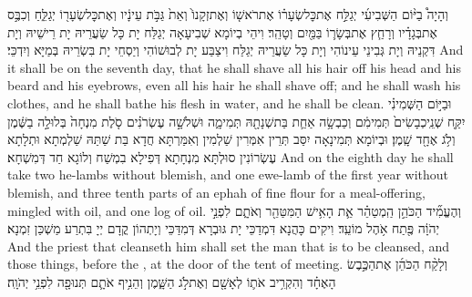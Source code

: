 {וְהָיָה֩ בַיּ֨וֹם הַשְּׁבִיעִ֜י יְגַלַּ֣ח אֶת\maqqaf כׇּל\maqqaf שְׂעָר֗וֹ אֶת\maqqaf רֹאשׁ֤וֹ וְאֶת\maqqaf זְקָנוֹ֙ וְאֵת֙ גַּבֹּ֣ת עֵינָ֔יו וְאֶת\maqqaf כׇּל\maqqaf שְׂעָר֖וֹ יְגַלֵּ֑חַ וְכִבֶּ֣ס אֶת\maqqaf בְּגָדָ֗יו וְרָחַ֧ץ אֶת\maqqaf בְּשָׂר֛וֹ בַּמַּ֖יִם וְטָהֵֽר׃}
{וִיהֵי בְיוֹמָא שְׁבִיעָאָה יְגַלַּח יָת כָּל שַׂעֲרֵיהּ יָת רֵישֵׁיהּ וְיָת דִּקְנֵיהּ וְיָת גְּבִינֵי עֵינוֹהִי וְיָת כָּל שַׂעֲרֵיהּ יְגַלַּח וִיצַבַּע יָת לְבוּשׁוֹהִי וְיַסְחֵי יָת בִּשְׂרֵיהּ בְּמַיָּא וְיִדְכֵּי׃}
{And it shall be on the seventh day, that he shall shave all his hair off his head and his beard and his eyebrows, even all his hair he shall shave off; and he shall wash his clothes, and he shall bathe his flesh in water, and he shall be clean.}{}
{וּבַיּ֣וֹם הַשְּׁמִינִ֗י יִקַּ֤ח שְׁנֵֽי\maqqaf כְבָשִׂים֙ תְּמִימִ֔ם וְכַבְשָׂ֥ה אַחַ֛ת בַּת\maqqaf שְׁנָתָ֖הּ תְּמִימָ֑ה וּשְׁלֹשָׁ֣ה עֶשְׂרֹנִ֗ים סֹ֤לֶת מִנְחָה֙ בְּלוּלָ֣ה בַשֶּׁ֔מֶן וְלֹ֥ג אֶחָ֖ד שָֽׁמֶן׃}
{וּבְיוֹמָא תְּמִינָאָה יִסַּב תְּרֵין אִמְּרִין שַׁלְמִין וְאִמַּרְתָּא חֲדָא בַּת שַׁתַּהּ שַׁלְמְתָא וּתְלָתָא עֶשְׂרוֹנִין סוּלְתָּא מִנְחָתָא דְּפִילָא בִמְשַׁח וְלוֹגָא חַד דְּמִשְׁחָא׃}
{And on the eighth day he shall take two he-lambs without blemish, and one ewe-lamb of the first year without blemish, and three tenth parts of an ephah of fine flour for a meal-offering, mingled with oil, and one log of oil.}{}
{וְהֶעֱמִ֞יד הַכֹּהֵ֣ן הַֽמְטַהֵ֗ר אֵ֛ת הָאִ֥ישׁ הַמִּטַּהֵ֖ר וְאֹתָ֑ם לִפְנֵ֣י יְהֹוָ֔ה פֶּ֖תַח אֹ֥הֶל מוֹעֵֽד׃}
{וִיקִים כָּהֲנָא דִּמְדַכֵּי יָת גּוּבְרָא דְּמִדַּכֵּי וְיָתְהוֹן קֳדָם יְיָ בִּתְרַע מַשְׁכַּן זִמְנָא׃}
{And the priest that cleanseth him shall set the man that is to be cleansed, and those things, before the \lord, at the door of the tent of meeting.}{}
{וְלָקַ֨ח הַכֹּהֵ֜ן אֶת\maqqaf הַכֶּ֣בֶשׂ הָאֶחָ֗ד וְהִקְרִ֥יב אֹת֛וֹ לְאָשָׁ֖ם וְאֶת\maqqaf לֹ֣ג הַשָּׁ֑מֶן וְהֵנִ֥יף אֹתָ֛ם תְּנוּפָ֖ה לִפְנֵ֥י יְהֹוָֽה׃}
